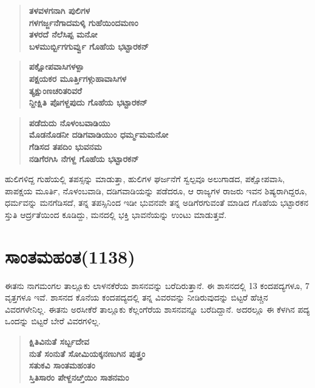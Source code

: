 \begin{verse}
\textbf{ತಳವಳಗನಾಗಿ ಪುಲಿಗಳ} \\\textbf{ಗಳಗರ್ಜ್ಜನೆಗಾದಮಳ್ಕಿ ಗುಹೆಯಿಂದಮಣಂ} \\\textbf{ತಳರದೆ ನೆಲೆಸಿಪ್ಪ ಮನೋ} \\\textbf{ಬಳಮುರ್ಬ್ಬಿಗಗುರ್ವ್ವು ಗೊಹೆಯ ಭಟ್ಟಾರಕನ್​}
\end{verse}

\begin{verse}
\textbf{ಪಕ್ಷೋಪವಾಸಿಗಳಳ್ಪಾ} \\\textbf{ಪಕ್ಷಯಕರ ಮೂರ್ತ್ತಿಗಳ್ಗುಹಾವಾಸಿಗಳ} \\\textbf{ತ್ಯಕ್ಷುಂಣಚರಿತರಿವರೆ} \\\textbf{ನ್ದೀಕ್ಷಿತಿ ಪೊಗಳ್ದಪುದು ಗೊಹೆಯ ಭಟ್ಟಾರಕನ್​}
\end{verse}

\begin{verse}
\textbf{ಪಡೆದುದು ನೊಳಂಬವಾಡಿಯು} \\\textbf{ಮೊಡನೊಡನೀ ದಡಿಗವಾಡಿಯುಂ ಧರ್ಮ್ಮಮಮನೋ} \\\textbf{ಗೆಡಿಸದ ತಪದಿಂ ಭುವನಮ} \\\textbf{ನಡಿಗೆರಗಿಸಿ ನೆಗಳ್ದ ಗೊಹೆಯ ಭಟ್ಟಾರಕನ್​ }
\end{verse}

ಹುಲಿಗಳಿದ್ದ ಗುಹೆಯಲ್ಲಿ ತಪಸ್ಸನ್ನು ಮಾಡುತ್ತಾ, ಹುಲಿಗಳ ಘರ್ಜನೆಗೆ ಸ್ವಲ್ಪವೂ ಅಲುಗಾಡದ, ಪಕ್ಷೋಪವಾಸಿ, ಪಾಪಕ್ಷಯ ಮೂರ್ತಿ, ನೊಳಂಬವಾಡಿ, ದಡಿಗವಾಡಿಯನ್ನು ಪಡೆದರೂ, ಆ ರಾಜ್ಯಗಳ ರಾಜರು ಇವನ ಶಿಷ್ಯರಾಗಿದ್ದರೂ, ಧರ್ಮವನ್ನು ಮನಗೆಡಿಸದೆ, ತನ್ನ ತಪಸ್ಸಿನಿಂದ ಇಡೀ ಭುವನವೇ ತನ್ನ ಅಡಿಗೆರಗುವಂತೆ ಮಾಡಿದ ಗೊಹೆಯ ಭಟ್ಟಾರಕನ ಸ್ತುತಿ ಆರ್ದ್ರತೆಯಿಂದ ಕೂಡಿದ್ದು, ಮನದಲ್ಲಿ ಭಕ್ತಿ ಭಾವನೆಯನ್ನು ಉಂಟು ಮಾಡುತ್ತವೆ.

\section*{ಸಾಂತಮಹಂತ(1138)}

ಈತನು ನಾಗಮಂಗಲ ತಾಲ್ಲೂಕು ಲಾಳನಕೆರೆಯ ಶಾಸನವನ್ನು ಬರೆದಿರುತ್ತಾನೆ. ಈ ಶಾಸನದಲ್ಲಿ 13 ಕಂದಪದ್ಯಗಳೂ, 7 ವೃತ್ತಗಳೂ ಇವೆ. ಶಾಸನದ ಕೊನೆಯ ಕಂದಪದ್ಯದಲ್ಲಿ ತನ್ನ ವಿವರವನ್ನು ನೀಡಿರುವುದನ್ನು ಬಿಟ್ಟರೆ ಹೆಚ್ಚಿನ ವಿವರಗಳೇನಿಲ್ಲ. ಈತನು ಅರಸೀಕೆರೆ ತಾಲ್ಲೂಕು ಕೆಲ್ಲಂಗೆರೆಯ ಶಾಸನವನ್ನೂ ಬರೆದಿದ್ದಾನೆ. ಅದರಲ್ಲೂ ಈ ಕೆಳಗಿನ ಪದ್ಯ ಒಂದನ್ನು ಬಿಟ್ಟರೆ ಬೇರೆ ವಿವರಗಳಿಲ್ಲ.

\begin{verse}
\textbf{ಕ್ಷಿತಿವಿನುತೆ ಸರ್ಬ್ಬದೇವ} \\\textbf{ನುತೆ ಸಂನುತೆ ಸೋಮಿಯಕ್ಕನಣುಗಿನ ಪುತ್ತ್ರಂ} \\\textbf{ಸತುಕವಿ ಸಾಂತಮಹಂತಂ} \\\textbf{ಸ್ತಿತಿಸಾರಂ ಪೇಳ್ದನೞ್ತಿಯಿಂ ಸಾಶನಮಂ }
\end{verse}

